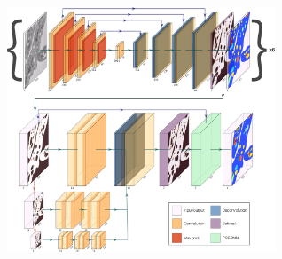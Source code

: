 \documentclass[final]{beamer}
\newlength{\sepwid}
\newlength{\onecolwid}
\newlength{\twocolwid}
\begin{document}
\begin{frame}[t]
\begin{columns}[t]
\begin{column}{\onecolwid}
\end{column} 


\begin{column}{\sepwid}\end{column} %


\begin{column}{\twocolwid}

    \begin{center}
        \begin{figure}
            \begin{subfigure}{\onecolwid}
                \includegraphics[width=\linewidth]{fig/fullnet-rearranged.png}
            \end{subfigure}
            \hfill
            \begin{subfigure}{\onecolwid}

\end{subfigure}
\end{figure}
\end{center}
\end{column}
\end{columns}
\end{frame}
\end{document}
